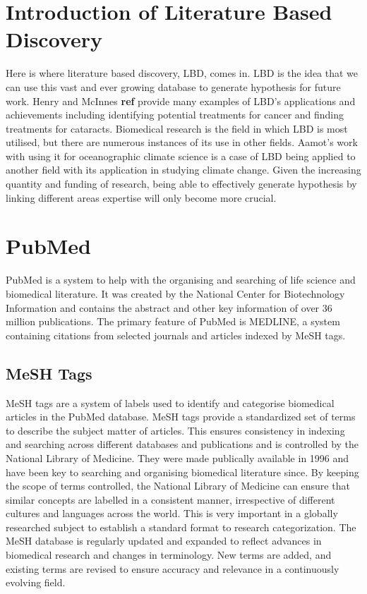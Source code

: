\documentclass{l4proj}
\begin{document}
\section{Introduction of Literature Based Discovery}

Here is where literature based discovery, LBD, comes in. LBD is the idea that we can use this vast and ever growing database to generate hypothesis for future work. Henry and McInnes \textbf{ref} provide many examples of LBD's applications and achievements including identifying potential treatments for cancer and finding treatments for cataracts. Biomedical research is the field in which LBD is most utilised, but there are numerous instances of its use in other fields. Aamot's work with using it for oceanographic climate science is a case of LBD being applied to another field with its application in studying climate change. Given the increasing quantity and funding of research, being able to effectively generate hypothesis by linking different areas expertise will only become more crucial.\\  

\section{PubMed}

PubMed is a system to help with the organising and searching of life science and biomedical literature. It was created by the National Center for Biotechnology Information and contains the abstract and other key information of over 36 million publications. The primary feature of PubMed is MEDLINE, a system containing citations from selected journals and articles indexed by MeSH tags. \\

\subsection{MeSH Tags}

MeSH tags are a system of labels used to identify and categorise biomedical articles in the PubMed database. MeSH tags provide a standardized set of terms to describe the subject matter of articles. This ensures consistency in indexing and searching across different databases and publications and is controlled by the National Library of Medicine. They were made publically available in 1996 and have been key to searching and organising biomedical literature since. By keeping the scope of terms controlled, the National Library of Medicine can ensure that similar concepts are labelled in a consistent manner, irrespective of different cultures and languages across the world. This is very important in a globally researched subject to establish a standard format to research categorization. The MeSH database is regularly updated and expanded to reflect advances in biomedical research and changes in terminology. New terms are added, and existing terms are revised to ensure accuracy and relevance in a continuously evolving field. \\
\end{document}
